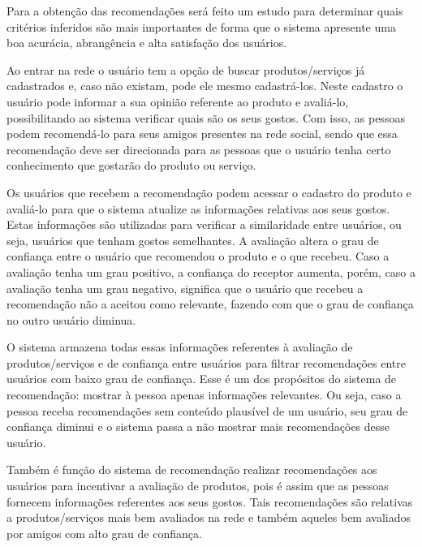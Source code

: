  Para a obtenção das recomendações será feito um estudo para determinar quais critérios inferidos são mais importantes de forma que o sistema apresente uma boa acurácia, abrangência e alta satisfação dos usuários.

 Ao entrar na rede o usuário tem a opção de buscar produtos/serviços já cadastrados e, caso não existam, pode ele mesmo cadastrá-los. Neste cadastro o usuário pode informar a sua opinião referente ao produto e avaliá-lo, possibilitando ao sistema verificar quais são os seus gostos. Com isso, as pessoas podem recomendá-lo para seus amigos presentes na rede social, sendo que essa recomendação deve ser direcionada para as pessoas que o usuário tenha certo conhecimento que gostarão do produto ou serviço.

 Os usuários que recebem a recomendação podem acessar o cadastro do produto e avaliá-lo para que o sistema atualize as informações relativas aos seus gostos. Estas informações são utilizadas para verificar a similaridade entre usuários, ou seja, usuários que tenham gostos semelhantes. A avaliação altera o grau de confiança entre o usuário que recomendou o produto e o que recebeu. Caso a avaliação tenha um grau positivo, a confiança do receptor aumenta, porém, caso a avaliação tenha um grau negativo, significa que o usuário que recebeu a recomendação não a aceitou como relevante, fazendo com que o grau de confiança no outro usuário diminua.

 O sistema armazena todas essas informações referentes à avaliação de produtos/serviços e de confiança entre usuários para filtrar recomendações entre usuários com baixo grau de confiança. Esse é um dos propósitos do sistema de recomendação: mostrar à pessoa apenas informações relevantes. Ou seja, caso a pessoa receba recomendações sem conteúdo plausível de um usuário, seu grau de confiança diminui e o sistema passa a não mostrar mais recomendações desse usuário.

 Também é função do sistema de recomendação realizar recomendações aos usuários para incentivar a avaliação de produtos, pois é assim que as pessoas fornecem informações referentes aos seus gostos. Tais recomendações são relativas a produtos/serviços mais bem avaliados na rede e também aqueles bem avaliados por amigos com alto grau de confiança.

